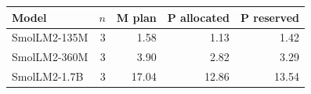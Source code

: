 \begin{tabular}{lrrrr}
\toprule
Model & $n$ & M plan & P allocated & P reserved \\
\midrule
SmolLM2-135M & 3 & 1.58 & 1.13 & 1.42 \\
SmolLM2-360M & 3 & 3.90 & 2.82 & 3.29 \\
SmolLM2-1.7B & 3 & 17.04 & 12.86 & 13.54 \\
\bottomrule
\end{tabular}
